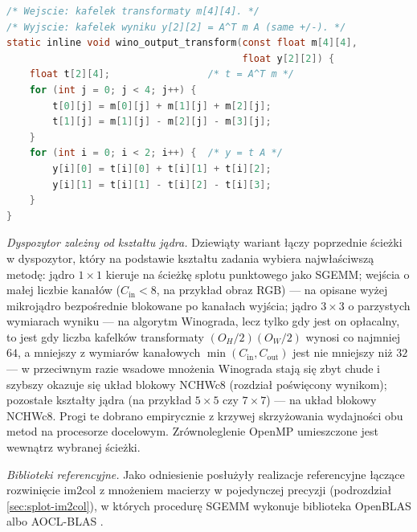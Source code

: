 \documentclass[a4paper,12pt]{book} %
\begin{document}
\begin{lstfloat}[t!]
\begin{lstlisting}[language=C, caption={Splot --- transformata wyjściowa algorytmu Winograda $F(2{\times}2, 3{\times}3)$: obliczenie kafelka wyniku $2 \times 2$ jako $Y = A^{\mathsf{T}} m A$ przez same dodawania i odejmowania (tablica pośrednia \texttt{t[2][4]} realizuje $A^{\mathsf{T}} m$, a pętla po wierszach mnożenie przez $A$)}, label={lst:conv-winograd}]
/* Wejscie: kafelek transformaty m[4][4]. */
/* Wyjscie: kafelek wyniku y[2][2] = A^T m A (same +/-). */
static inline void wino_output_transform(const float m[4][4],
                                         float y[2][2]) {
    float t[2][4];                 /* t = A^T m */
    for (int j = 0; j < 4; j++) {
        t[0][j] = m[0][j] + m[1][j] + m[2][j];
        t[1][j] = m[1][j] - m[2][j] - m[3][j];
    }
    for (int i = 0; i < 2; i++) {  /* y = t A */
        y[i][0] = t[i][0] + t[i][1] + t[i][2];
        y[i][1] = t[i][1] - t[i][2] - t[i][3];
    }
}
\end{lstlisting}
\end{lstfloat}

\emph{Dyspozytor zależny od kształtu jądra.} Dziewiąty wariant łączy poprzednie ścieżki w dyspozytor, który na podstawie kształtu zadania wybiera najwłaściwszą metodę: jądro $1 \times 1$ kieruje na ścieżkę splotu punktowego jako SGEMM; wejścia o małej liczbie kanałów ($C_{\mathrm{in}} < 8$, na przykład obraz RGB) --- na opisane wyżej mikrojądro bezpośrednie blokowane po kanałach wyjścia; jądro $3 \times 3$ o parzystych wymiarach wyniku --- na algorytm Winograda, lecz tylko gdy jest on opłacalny, to jest gdy liczba kafelków transformaty $(O_H/2)(O_W/2)$ wynosi co najmniej $64$, a mniejszy z wymiarów kanałowych $\min(C_{\mathrm{in}}, C_{\mathrm{out}})$ jest nie mniejszy niż $32$ --- w przeciwnym razie wsadowe mnożenia Winograda stają się zbyt chude i szybszy okazuje się układ blokowy NCHWc8 (rozdział poświęcony wynikom); pozostałe kształty jądra (na przykład $5 \times 5$ czy $7 \times 7$) --- na układ blokowy NCHWc8. Progi te dobrano empirycznie z krzywej skrzyżowania wydajności obu metod na procesorze docelowym. Zrównoleglenie OpenMP umieszczone jest wewnątrz wybranej ścieżki.

\emph{Biblioteki referencyjne.} Jako odniesienie posłużyły realizacje referencyjne łączące rozwinięcie im2col z mnożeniem macierzy w pojedynczej precyzji (podrozdział \ref{sec:splot-im2col}), w których procedurę SGEMM wykonuje biblioteka OpenBLAS \cite{chellapilla2006highperf,zhang2012openblas} albo AOCL-BLAS \cite{amd_aocl_blas}.
\end{document}
